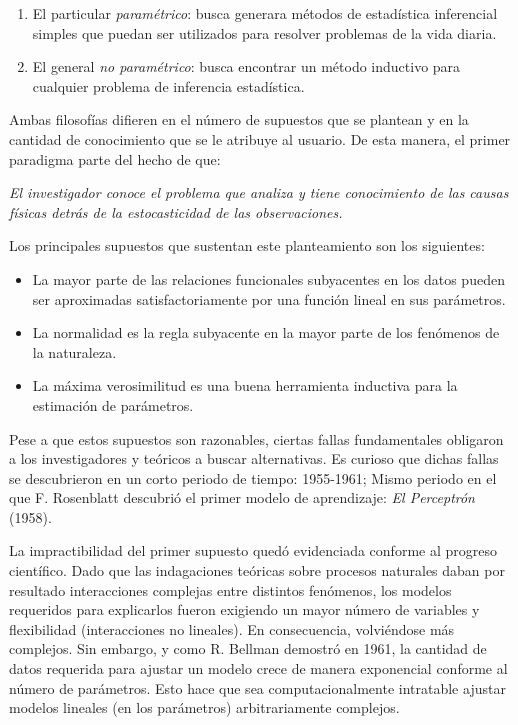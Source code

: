 \documentclass{book}
\theoremstyle{plain}
\theoremstyle{definition}
\theoremstyle{remark}
\begin{document}
\begin{enumerate}
\item El particular \emph{paramétrico}: busca generara métodos de estadística inferencial  simples que puedan ser utilizados para resolver problemas de la vida diaria.
\item El general \emph{no paramétrico}: busca encontrar un método inductivo para cualquier problema de inferencia estadística.
\end{enumerate}

Ambas filosofías difieren en el número de supuestos que se plantean y en la cantidad de conocimiento que se le atribuye al usuario. De esta manera, el primer paradigma parte del hecho de que:

\begin{changemargin}{1.5cm}{1.5cm}
\emph{El investigador conoce el problema que analiza y tiene conocimiento de las causas físicas detrás de la estocasticidad de las observaciones.}
\end{changemargin}

Los principales supuestos que sustentan este planteamiento son los siguientes:

\begin{itemize}
\item La mayor parte de las relaciones funcionales subyacentes en los datos pueden ser aproximadas satisfactoriamente por una función lineal en sus parámetros.
\item La normalidad es la regla subyacente en la mayor parte de los fenómenos de la naturaleza.
\item La máxima verosimilitud es una buena herramienta inductiva para la estimación de parámetros.
\end{itemize}

Pese a que estos supuestos son razonables, ciertas fallas fundamentales obligaron a los investigadores y teóricos a buscar alternativas. Es curioso que dichas fallas se descubrieron en un corto periodo de tiempo: 1955-1961; Mismo periodo en el que F. Rosenblatt descubrió el primer modelo de aprendizaje: \emph{El Perceptrón} (1958).

La impractibilidad del primer supuesto quedó evidenciada conforme al progreso científico. Dado que las indagaciones teóricas sobre procesos naturales daban por resultado interacciones complejas entre distintos fenómenos, los modelos requeridos para explicarlos fueron exigiendo un mayor número  de variables y flexibilidad (interacciones no lineales). En consecuencia, volviéndose más complejos. Sin embargo, y como R. Bellman demostró en 1961, la cantidad de datos requerida para ajustar un modelo crece de manera exponencial conforme al número de parámetros. Esto hace que sea computacionalmente intratable ajustar modelos lineales (en los parámetros) arbitrariamente complejos.
\end{document}
